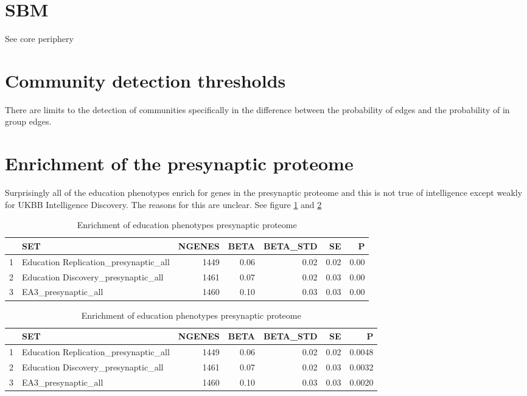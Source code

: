 \section{SBM}
See core periphery

 \section{Community detection thresholds}
There are limits to the detection of communities specifically in the difference between the probability of edges and the probability of in group edges.
 
 \section{Enrichment of the presynaptic proteome}
 
 Surprisingly all of the education phenotypes enrich for genes in the presynaptic proteome and this is not true of intelligence except weakly for UKBB Intelligence Discovery. The reasons for this are unclear. See figure \ref{Table:Enrichment of intelligence phenotypes presynaptic proteome} and \ref{Table:Enrichment of education phenotypes presynaptic proteome}
 
\begin{table}[ht]
\centering
\begin{tabular}{rlrrrrr}
  \hline
 & SET & NGENES & BETA & BETA\_STD & SE & P \\ 
  \hline 

1 & Education Replication\_presynaptic\_all & 1449 & 0.06 & 0.02 & 0.02 & 0.00 \\ 
  2 & Education Discovery\_presynaptic\_all & 1461 & 0.07 & 0.02 & 0.03 & 0.00 \\ 
  3 & EA3\_presynaptic\_all & 1460 & 0.10 & 0.03 & 0.03 & 0.00 \\ 
   \hline
\end{tabular}
\caption{Enrichment of education phenotypes presynaptic proteome} 
\label{Table:Enrichment of intelligence phenotypes presynaptic proteome}
\end{table}

\begin{table}
\centering
\begin{tabular}{rlrrrrr}
  \hline
 & SET & NGENES & BETA & BETA\_STD & SE & P \\ 
  \hline
1 & Education Replication\_presynaptic\_all & 1449 & 0.06 & 0.02 & 0.02 & 0.0048 \\ 
  2 & Education Discovery\_presynaptic\_all & 1461 & 0.07 & 0.02 & 0.03 & 0.0032 \\ 
  3 & EA3\_presynaptic\_all & 1460 & 0.10 & 0.03 & 0.03 & 0.0020 \\ 
   \hline
\end{tabular}
\caption{Enrichment of education phenotypes presynaptic proteome} 
\label{Table:Enrichment of education phenotypes presynaptic proteome}
\end{table}


